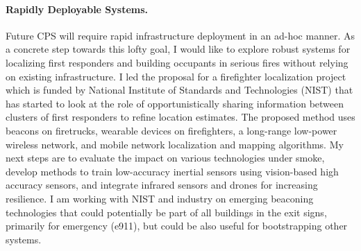 \documentclass[10pt]{article}
\begin{document}


\paragraph{Rapidly Deployable Systems. }
Future CPS will require rapid infrastructure deployment in an ad-hoc manner.  As a concrete step towards this lofty goal, I would like to explore robust systems for localizing first responders and building occupants in serious fires without relying on existing infrastructure. I led the proposal for a firefighter localization project which is funded by National Institute of Standards and Technologies (NIST) that has started to look at the role of opportunistically sharing information between clusters of first responders to refine location estimates.
The proposed method uses beacons on firetrucks, wearable devices on firefighters, a long-range low-power wireless network, and mobile network localization and mapping algorithms. 
My next steps are to evaluate the impact on various technologies under smoke, develop methods to train low-accuracy inertial sensors using vision-based high accuracy sensors, and integrate infrared sensors and drones for increasing resilience. I am working with NIST and industry on emerging beaconing technologies that could potentially be part of all buildings in the exit signs, primarily for emergency (e911), but could be also useful for bootstrapping other systems. 
\end{document}
